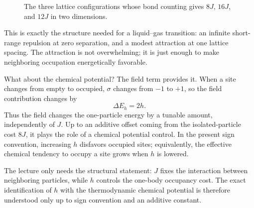 \begin{figure}[h]
\centering
{}
\caption{The three lattice configurations whose bond counting gives \(8J\), \(16J\), and \(12J\) in two dimensions.}
\end{figure}

This is exactly the structure needed for a liquid--gas transition: an infinite short-range repulsion at zero separation, and a modest attraction at one lattice spacing. The attraction is not overwhelming; it is just enough to make neighboring occupation energetically favorable.

What about the chemical potential? The field term provides it. When a site changes from empty to occupied, \(\sigma\) changes from \(-1\) to \(+1\), so the field contribution changes by
\begin{equation}
\Delta E_h = 2h.
\end{equation}
Thus the field changes the one-particle energy by a tunable amount, independently of \(J\). Up to an additive offset coming from the isolated-particle cost \(8J\), it plays the role of a chemical potential control. In the present sign convention, increasing \(h\) disfavors occupied sites; equivalently, the effective chemical tendency to occupy a site grows when \(h\) is lowered.

\begin{remark}
The lecture only needs the structural statement: \(J\) fixes the interaction between neighboring particles, while \(h\) controls the one-body occupancy cost. The exact identification of \(h\) with the thermodynamic chemical potential is therefore understood only up to sign convention and an additive constant.
\end{remark}

